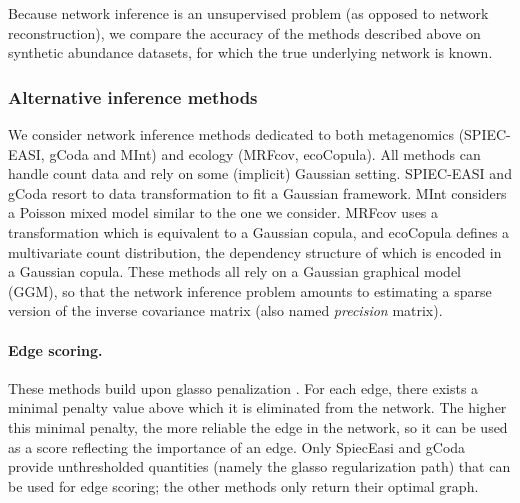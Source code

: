 Because network inference is an unsupervised problem (as opposed to network reconstruction), we compare the accuracy of the methods described above on synthetic abundance datasets, for which the true underlying network is known.

\subsubsection{Alternative inference methods} \label{altmethods}
 
We consider network inference methods dedicated to both 
metagenomics (SPIEC-EASI, gCoda and MInt) and ecology (MRFcov, ecoCopula). All methods can handle count data and rely on some (implicit) Gaussian setting. SPIEC-EASI \citep{kurtz} and gCoda \citep{gcoda} resort to data transformation to fit a Gaussian framework. MInt \citep{MInt} considers a Poisson mixed model similar to the one  we consider. MRFcov \citep{CWL18} uses a transformation which is equivalent to a Gaussian copula, and ecoCopula \citep{PWT19} defines a multivariate count distribution, the dependency structure of which is encoded in a Gaussian copula. These methods all rely on a Gaussian graphical model (GGM), so that the network inference problem amounts to estimating a sparse version of the inverse covariance matrix (also named {\sl precision} matrix). 
 

\paragraph{Edge scoring.}
 These methods build upon glasso penalization \citep{FHT08}. For each edge, there exists a minimal penalty value above which it is eliminated from the network. The higher this minimal penalty, the more reliable the edge in the network, so it can be used as a score reflecting the importance of an edge. Only SpiecEasi and gCoda provide unthresholded quantities (namely the glasso regularization path) that can be used for edge scoring; the other methods only return their optimal graph.

